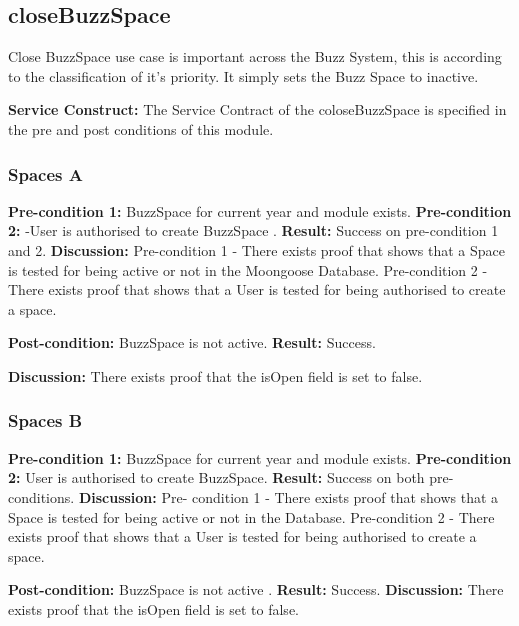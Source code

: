 
\newpage
\subsection{closeBuzzSpace}

Close BuzzSpace use case is important across the Buzz System, this is according to the classification of it's priority. It simply sets the Buzz Space to inactive. 

\textbf{Service Construct:}  The Service Contract of the coloseBuzzSpace is specified in the pre and post conditions of this module.	 
  				   \newline

\subsubsection{Spaces A}
\textbf{Pre-condition 1:}  BuzzSpace for current year and module exists.  \newline
\textbf{Pre-condition 2:}  -User is authorised to create BuzzSpace . \newline
\textbf{Result:}  Success on pre-condition 1 and 2.  \newline \newline
\textbf{Discussion:} Pre-condition 1 - There exists  proof that shows that a  Space is tested for being active or not in the Moongoose Database. Pre-condition 2 - There exists  proof that shows that a  User is tested for being authorised to create a space. \newline \newline

\textbf{Post-condition:}  BuzzSpace is not active.  \newline
\textbf{Result:}  Success. \newline \newline

\textbf{Discussion:} There exists  proof that the isOpen field is set to false.\newline

\subsubsection{Spaces B}
\textbf{Pre-condition 1:}  BuzzSpace for current year and module exists.  \newline
\textbf{Pre-condition 2:}  User is authorised to create BuzzSpace.  \newline
\textbf{Result:}  Success on both pre-conditions. \newline
\textbf{Discussion:} Pre- condition 1 -  There exists  proof that shows that a  Space is tested for being active or not in the Database. Pre-condition 2 -  There exists  proof that shows that a  User is tested for being authorised to create a space.\newline \newline 

\textbf{Post-condition:}  BuzzSpace is not active . \newline
\textbf{Result:}  Success. \newline\newline
\textbf{Discussion:}  There exists  proof that the isOpen field is set to false. \newline


